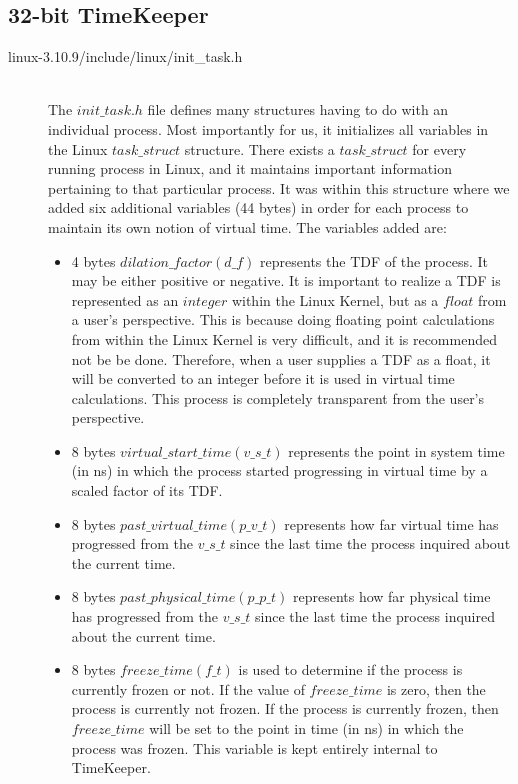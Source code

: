\subsection{32-bit TimeKeeper}
\begin{description} 
\item[linux-3.10.9/include/linux/init\_task.h] \hfill \\
        The $init\_task.h$ file defines many structures having to do with an individual process. Most importantly for us, it initializes all variables in the Linux $task\_struct$ structure. There exists a $task\_struct$ for every running process in Linux, and it maintains important information pertaining to that particular process. It was within this structure where we added six additional variables (44 bytes) in order for each process to maintain its own notion of virtual time. The variables added are:
        \begin{itemize} 
                        \item 4 bytes $dilation\_factor (d\_f)$ represents the TDF of the process. It may be either positive or negative. It is important to realize a TDF is represented as an $integer$ within the Linux Kernel, but as a $float$ from a user's perspective. This is because doing floating point calculations from within the Linux Kernel is very difficult, and it is recommended not be be done. Therefore, when a user supplies a TDF as a float, it will be converted to an integer before it is used in virtual time calculations. This process is completely transparent from the user's perspective.
                \item 8 bytes $virtual\_start\_time (v\_s\_t)$ represents the point in system time (in ns) in which the process started progressing in virtual time by a scaled factor of its TDF.
                \item 8 bytes $past\_virtual\_time (p\_v\_t)$ represents how far virtual time has progressed from the $v\_s\_t$ since the last time the process inquired about the current time.
                \item 8 bytes $past\_physical\_time (p\_p\_t)$ represents how far physical time has progressed from the $v\_s\_t$ since the last time the process inquired about the current time.
                \item 8 bytes $freeze\_time (f\_t)$ is used to determine if the process is currently frozen or not. If the value of $freeze\_time$ is zero, then the process is currently not frozen. If the process is currently frozen, then $freeze\_time$ will be set to the point in time (in ns) in which the process was frozen. This variable is kept entirely internal to TimeKeeper. 

\end{itemize}
\end{description}
